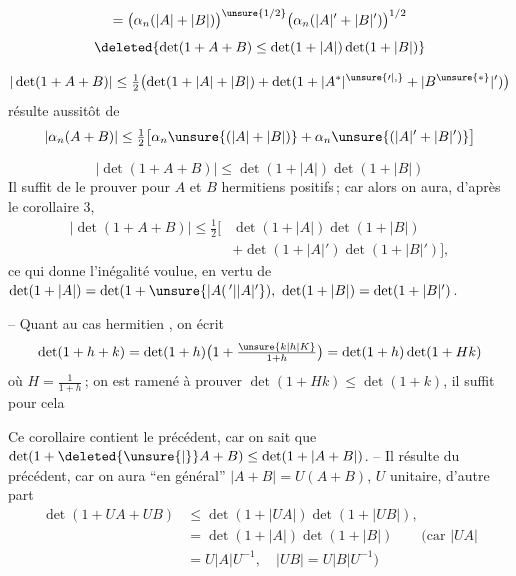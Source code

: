 \[
=\bigl(\alpha_n(|A|+|B|)\bigr)^{\unsure{1/2}}\bigl(\alpha_n(|A|'+|B|')\bigr)^{1/2}
\]
\[
\deleted{\det(1+A+B)\leq\det(1+|A|)\det(1+|B|)}
\]

\[
|\det(1+A+B)|\leq\tfrac12\bigl(\det(1+|A|+|B|)+\det(1+|A^*|^{\unsure{\prime|,}}+|B^{\unsure{*}}|')\bigr)
\]
résulte aussitôt de
\[
|\alpha_n(A+B)|\leq\tfrac12\bigl[\alpha_n\unsure{(|A|+|B|)}+\alpha_n\unsure{(|A|'+|B|')}\bigr]
\]

\[
\boxed{|\det(1+A+B)|\leq\det(1+|A|)\det(1+|B|)}
\]
Il suffit de  le prouver pour $A$ et $B$
hermitiens positifs\,; car alors on aura, d'après
le corollaire 3,
\[
\begin{aligned}
|\det(1+A+B)|\leq\tfrac12\bigl[&\det(1+|A|)\det(1+|B|)\\
&+\det(1+|A|')\det(1+|B|')\bigr],
\end{aligned}
\]
ce qui donne l'inégalité voulue, en vertu de
$\det(1+|A|)=\det(1+\unsure{\lvert A(\,{}'|\lvert A\rvert'}),\ \det(1+|B|)=\det(1+|B|')$.

-- Quant au cas hermitien , on écrit
\[
\det(1+h+k)=\det(1+h)\bigl(1+\tfrac{\unsure{k|h|K}}{1+h}\bigr)=\det(1+h)\det(1+Hk)
\]
où $H=\frac{1}{1+h}$\,; on est ramené à prouver
$\det(1+Hk)\leq\det(1+k)$, il suffit pour cela

Ce corollaire contient le précédent, car on sait
que $\det(1+\deleted{\unsure{|}}A+B)\leq\det(1+|A+B|)$. -- Il
résulte du précédent, car on aura ``en général''
$|A+B|=U(A+B)$, $U$ unitaire, d'autre part
\[
\begin{aligned}
\det(1+UA+UB)&\leq\det(1+|UA|)\det(1+|UB|),\\
&=\det(1+|A|)\det(1+|B|)\qquad(\text{car } |UA|\\
&=U|A|U^{-1},\quad |UB|=U|B|U^{-1})
\end{aligned}
\]
